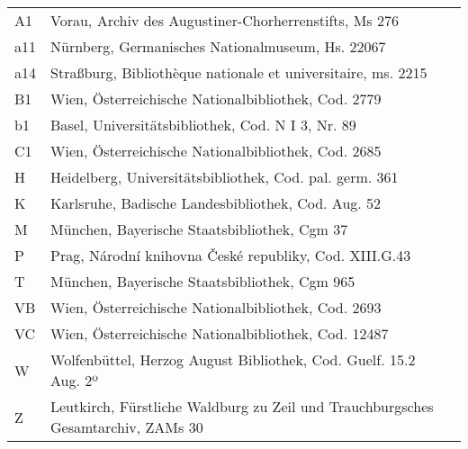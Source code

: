 \noindent%
\begin{tabularx}{\linewidth}{@{} l X l @{}}
A1	& Vorau, Archiv des Augustiner-Chorherrenstifts, Ms 276
	& \autocite[1432]{hsc} \\
a11	& Nürnberg, Germanisches Nationalmuseum, Hs. 22067
	& \autocite[1189]{hsc} \\
a14	& Straßburg, Bibliothèque nationale et universitaire, ms. 2215
	& \autocite[1828]{hsc} \\
B1	& Wien, Österreichische Nationalbibliothek, Cod. 2779
	& \autocite[2693]{hsc} \\
b1	& Basel, Universitätsbibliothek, Cod. N I 3, Nr. 89
	& \autocite[1158]{hsc} \\
C1	& Wien, Österreichische Nationalbibliothek, Cod. 2685
	& \autocite[2013]{hsc} \\
H	& Heidelberg, Universitätsbibliothek, Cod. pal. germ. 361
	& \autocite[1181]{hsc} \\
K	& Karlsruhe, Badische Landesbibliothek, Cod. Aug. 52
	& \autocite[8470]{hsc} \\
M	& München, Bayerische Staatsbibliothek, Cgm 37
	& \autocite[2119]{hsc} \\
P	& Prag, Národní knihovna České republiky, Cod. XIII.G.43
	& \autocite[1168]{hsc} \\
T	& München, Bayerische Staatsbibliothek, Cgm 965
	& \autocite[8472]{hsc} \\
VB	& Wien, Österreichische Nationalbibliothek, Cod. 2693
	& \autocite[1215]{hsc} \\
VC	& Wien, Österreichische Nationalbibliothek, Cod. 12487
	& \autocite[3394]{hsc} \\
W	& Wolfenbüttel, Herzog August Bibliothek, Cod. Guelf. 15.2 Aug. 2º
	& \autocite[6668]{hsc} \\
Z	& Leutkirch, Fürstliche Waldburg zu Zeil und Trauch\-burg\-sches Gesamt\-archiv, ZAMs 30
	& \autocite[8471]{hsc} \\
\end{tabularx}
